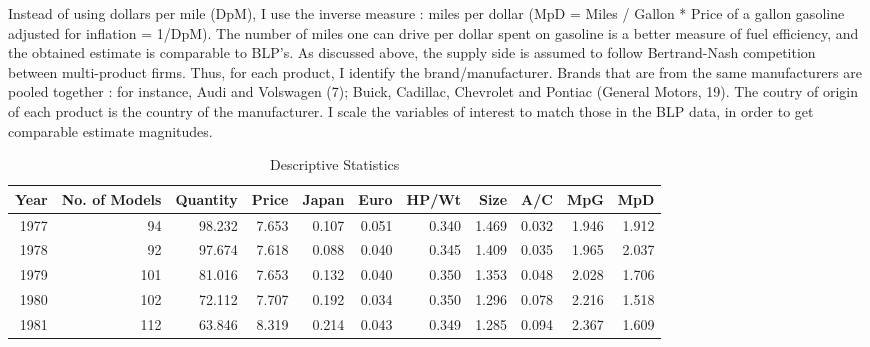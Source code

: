 \documentclass{article}\usepackage[]{graphicx}\usepackage[]{color}
\begin{document}
Instead of using dollars per mile (DpM), I use the inverse measure : miles per dollar (MpD = Miles / Gallon * Price of a gallon gasoline adjusted for inflation = 1/DpM). The number of miles one can drive per dollar spent on gasoline is a better measure of fuel efficiency, and the obtained estimate is comparable to BLP's. As discussed above, the supply side is assumed to follow Bertrand-Nash competition between multi-product firms. Thus, for each product, I  identify the brand/manufacturer. Brands that are from the same manufacturers are pooled together : for instance, Audi and Volswagen (7); Buick, Cadillac, Chevrolet and Pontiac (General Motors, 19). The coutry of origin of each product is the country of the manufacturer. I scale the variables of interest to match those in the BLP data, in order to get comparable estimate magnitudes.



\begin{table}[ht]
\centering
\caption{Descriptive Statistics} 
\label{tbl:desc_stats}
\begingroup\footnotesize
\begin{tabular}{rrrrrrrrrrr}
  \toprule 
 Year & No. of Models & Quantity & Price  & Japan & Euro & HP/Wt & Size & A/C & MpG & MpD \\
 \midrule 
 1977 &   94 & 98.232 & 7.653 & 0.107 & 0.051 & 0.340 & 1.469 & 0.032 & 1.946 & 1.912 \\ 
  1978 &   92 & 97.674 & 7.618 & 0.088 & 0.040 & 0.345 & 1.409 & 0.035 & 1.965 & 2.037 \\ 
  1979 &  101 & 81.016 & 7.653 & 0.132 & 0.040 & 0.350 & 1.353 & 0.048 & 2.028 & 1.706 \\ 
  1980 &  102 & 72.112 & 7.707 & 0.192 & 0.034 & 0.350 & 1.296 & 0.078 & 2.216 & 1.518 \\ 
  1981 &  112 & 63.846 & 8.319 & 0.214 & 0.043 & 0.349 & 1.285 & 0.094 & 2.367 & 1.609 \\ 
   \bottomrule 
\end{tabular}
\endgroup
\end{table}
\end{document}
